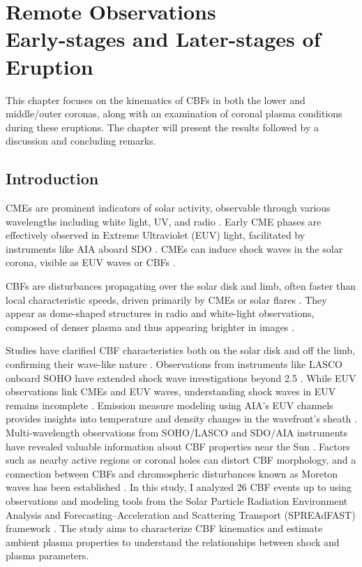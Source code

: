 \chapter[Remote Observations: Early-stages and Later-stages of Eruption]{Remote Observations\\\LARGE Early-stages and Later-stages of Eruption}
\label{chapter2}
This chapter focuses on the kinematics of CBFs in both the lower and middle/outer coronas, along with an examination of coronal plasma conditions during these eruptions. The chapter will present the results followed by a discussion and concluding remarks.

\section{Introduction}
CMEs are prominent indicators of solar activity, observable through various wavelengths including white light, UV, and radio \citep{vourlidas_2003, zhang_2006, bein_2011, bastian_2001, veronig_2010}. Early CME phases are effectively observed in Extreme Ultraviolet (EUV) light, facilitated by instruments like AIA aboard SDO \citep{lemen_2011, pesnell_2012}. CMEs can induce shock waves in the solar corona, visible as EUV waves or CBFs \citep{thompson_1998, long_2011}.

CBFs are disturbances propagating over the solar disk and limb, often faster than local characteristic speeds, driven primarily by CMEs or solar flares \citep{thompson_1998, veronig_2010, vrsnak_2008, magdaleni_2010, nindos_2011}. They appear as dome-shaped structures in radio and white-light observations, composed of denser plasma and thus appearing brighter in images \citep{pick_2006, nindos_2008, thompson_2009}.

Studies have clarified CBF characteristics both on the solar disk and off the limb, confirming their wave-like nature \citep{nitta_2013, long_2011, olmedo_2012}. Observations from instruments like LASCO onboard SOHO have extended shock wave investigations beyond 2.5 \rsun \citep{domingo_1995, vourlidas_2003}. While EUV observations link CMEs and EUV waves, understanding shock waves in EUV remains incomplete \citep{patsourakos_2009, kozarev_2011}. Emission measure modeling using AIA's EUV channels provides insights into temperature and density changes in the wavefront's sheath \citep{kozarev_2011}. Multi-wavelength observations from SOHO/LASCO and SDO/AIA instruments have revealed valuable information about CBF properties near the Sun \citep{warmuth_2015}.
Factors such as nearby active regions or coronal holes can distort CBF morphology, and a connection between CBFs and chromospheric disturbances known as Moreton waves has been established \citep{ofman_2002, mann_2003, piantschitsch_2018, thompson_1999b}.
In this study, I analyzed 26 CBF events up to \rsun using observations and modeling tools from the Solar Particle Radiation Environment Analysis and Forecasting--Acceleration and Scattering Transport (SPREAdFAST) framework \citep{kozarev_2022}. The study aims to characterize CBF kinematics and estimate ambient plasma properties to understand the relationships between shock and plasma parameters.

